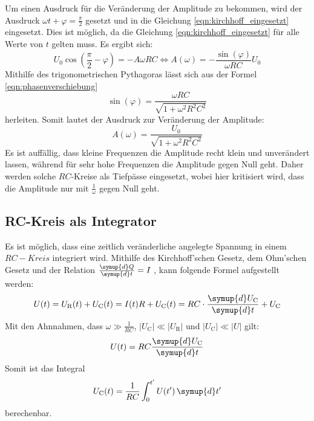     \noindent Um einen Ausdruck für die Veränderung der Amplitude zu bekommen, wird der Ausdruck $\omega t + \varphi = \frac{\pi}{2}$ gesetzt und in die Gleichung
    \eqref{eqn:kirchhoff_eingesetzt} eingesetzt. Dies ist möglich, da die Gleichung \eqref{eqn:kirchhoff_eingesetzt} für alle Werte von $t$ gelten muss.
    Es ergibt sich:
    \begin{equation*}
        U_0 \cos(\frac{\pi}{2} - \varphi) = -A \omega RC  \iff A(\omega) = - \frac{\sin(\varphi)}{\omega RC }U_0
    \end{equation*}
    Mithilfe des trigonometrischen Pythagoras lässt sich aus der Formel \eqref{eqn:phasenverschiebung} 
    \begin{equation*}
        \sin(\varphi) = \frac{\omega RC}{\sqrt{1 + \omega^2 R^2 C^2}}
    \end{equation*}
    herleiten. Somit lautet der Ausdruck zur Veränderung der Amplitude:
    \begin{equation} \label{eqn:amplitude}
        A(\omega) = \frac{U_0}{\sqrt{1 + \omega^2 R^2 C^2}}
    \end{equation}
    Es ist auffällig, dass kleine Frequenzen die Amplitude recht klein und unverändert lassen, während für sehr hohe Frequenzen die Amplitude gegen Null geht. 
    Daher werden solche $RC$-Kreise als Tiefpässe eingesetzt, wobei hier kritisiert wird, dass die Amplitude nur mit $\frac{1}{ \omega}$ gegen Null geht.


\subsection{RC-Kreis als Integrator}

    Es ist möglich, dass eine zeitlich veränderliche  angelegte Spannung in einem $RC-Kreis$ integriert wird. Mithilfe des Kirchhoff'schen Gesetz, dem Ohm'schen 
    Gesetz und der Relation $\frac{\symup{d}Q}{\symup{d}t} = I$ , kann folgende Formel aufgestellt werden:
    \begin{equation*}
        U(t) = U_{\text{R}}(t) + U_{\text{C}}(t) = I(t)R + U_{\text{C}}(t) = RC \cdot \frac{\symup{d}U_{\text{C}}}{\symup{d}t} + U_{\text{C}} 
    \end{equation*}
    Mit den Ahnnahmen, dass $\omega \gg \frac{1}{RC}$, $|U_{\text{C}}| \ll |U_{\text{R}}|$ und $|U_{\text{C}}| \ll |U| $ gilt:
    \begin{equation*}
        U(t) = RC \frac{\symup{d}U_{\text{C}}}{\symup{d}t}
    \end{equation*}
    Somit ist das Integral 
    \begin{equation*}
        U_{\text{C}} (t) = \frac{1}{RC} \int_0^{t'} U(t') \, \symup{d}t'
    \end{equation*}
    berechenbar. 